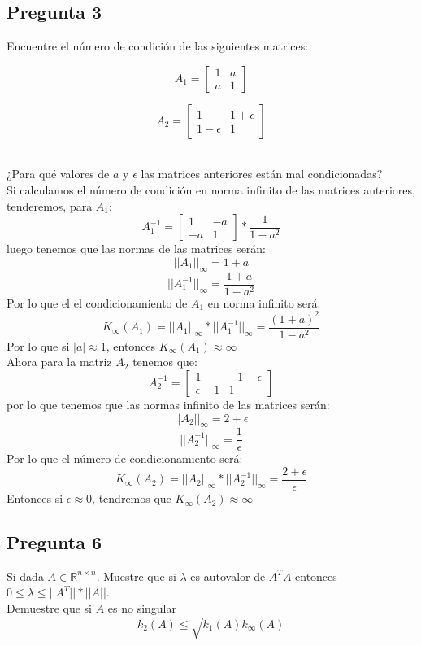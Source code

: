 \documentclass{article}
\begin{document}
\subsection*{Pregunta 3}
Encuentre el número de condición de las siguientes matrices:\\
\begin{figure}[h!]
\begin{minipage}{4cm}
\center
$$
A_1 =  
\begin{bmatrix}
1 & a\\
a & 1
\end{bmatrix}$$
\end{minipage}
\begin{minipage}{4cm}
$$A_2 =
\begin{bmatrix}
1 & 1 + \epsilon\\
1 - \epsilon & 1
\end{bmatrix}$$
\end{minipage}
\end{figure}
\\
¿Para qué valores de $a$ y $\epsilon$ las matrices anteriores están mal condicionadas?\\

Si calculamos el número de condición en norma infinito de las matrices anteriores, tenderemos, para $A_1$:
$$A_{1}^{-1} =
\begin{bmatrix}
1 & -a\\
-a & 1
\end{bmatrix}
*\frac{1}{1-a^{2}}
$$
luego tenemos que las normas de las matrices serán:
$$||A_1||_{\infty} = 1 + a$$
$$||A_{1}^{-1}||_{\infty} = \frac{1+a}{1-a^{2}} $$
Por lo que el el condicionamiento de $A_1$ en norma infinito será:
$$K_{\infty}(A_1)=||A_1||_{\infty}*||A_{1}^{-1}||_{\infty} = \frac{(1+a)^{2}}{1-a^{2}}$$
Por lo que si $|a|\approx 1$, entonces $K_{\infty}(A_1)\approx \infty$\\

Ahora para la matriz $A_2$ tenemos que:
$$A_{2}^{-1}=
\begin{bmatrix}
1 & -1-\epsilon\\
\epsilon -1 & 1
\end{bmatrix}
$$
por lo que tenemos que las normas infinito de las matrices serán:
$$||A_2||_{\infty} = 2+\epsilon$$
$$||A_{2}^{-1}||_{\infty} = \frac{1}{\epsilon}$$
Por lo que el número de condicionamiento será:
$$K_{\infty}(A_2)=||A_2||_{\infty}*||A_{2}^{-1}||_{\infty} = \frac{2 + \epsilon}{\epsilon}$$
Entonces si $\epsilon \approx 0$, tendremos que $K_{\infty}(A_2) \approx \infty$
\subsection*{Pregunta 6}
Si dada $A \in \mathbb{R}^{n\times n}$. Muestre que si $\lambda$ es autovalor de $A^{T}A$ entonces $0\leq \lambda\leq ||A^{T}||* ||A||$.\\
Demuestre que si $A$ es no singular
$$k_2(A) \leq \sqrt{k_1(A)k_\infty(A)} $$
\end{document}
